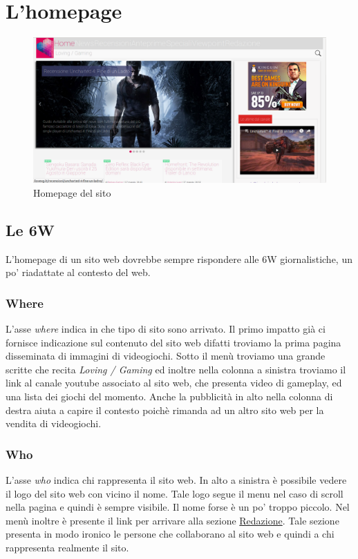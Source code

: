 \documentclass[../ProgettoTecWeb2.tex]{subfiles}
\begin{document}
\section{L'homepage}
	\begin{figure} [H]
		\centering
		\includegraphics[scale=0.3]{img/ScreenHomePage}
		\caption{Homepage del sito}
	\end{figure}
	\subsection{Le 6W}
		L'homepage di un sito web dovrebbe sempre rispondere alle 6W giornalistiche, un po' riadattate al contesto del web.
		\subsubsection{Where}
			L'asse \textit{where} indica in che tipo di sito sono arrivato. Il primo impatto già ci fornisce indicazione sul contenuto del sito web difatti troviamo la prima pagina disseminata di immagini di videogiochi. Sotto il menù troviamo una grande scritte che recita \textit{Loving / Gaming} ed inoltre nella colonna a sinistra troviamo il link al canale youtube associato al sito web, che presenta video di gameplay, ed una lista dei giochi del momento. Anche la pubblicità in alto nella colonna di destra aiuta a capire il contesto poichè rimanda ad un altro sito web per la vendita di videogiochi.
		\subsubsection{Who}
			L'asse \textit{who} indica chi rappresenta il sito web. In alto a sinistra è possibile vedere il logo del sito web con vicino il nome. Tale logo segue il menu nel caso di scroll nella pagina e quindi è sempre visibile. Il nome forse è un po' troppo piccolo. Nel menù inoltre è presente il link per arrivare alla sezione \href{http://ilovevg.it/redazione/}{Redazione}. Tale sezione presenta in modo ironico le persone che collaborano al sito web e quindi a chi rappresenta realmente il sito.
\end{document}
